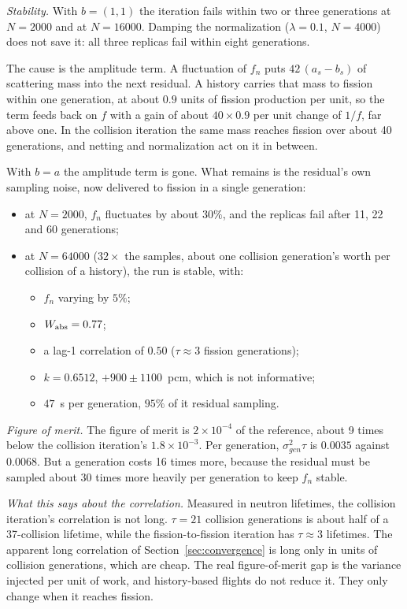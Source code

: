 \emph{Stability.} With $b=(1,1)$ the iteration fails within two or three generations at $N=2000$ and
at $N=16000$. Damping the normalization ($\lambda=0.1$, $N=4000$) does not save it: all three
replicas fail within eight generations.

The cause is the amplitude term. A fluctuation of $f_n$ puts $42\,(a_s-b_s)$ of scattering mass into
the next residual. A history carries that mass to fission within one generation, at about $0.9$
units of fission production per unit, so the term feeds back on $f$ with a gain of about $40\times0.9$
per unit change of $1/f$, far above one. In the collision iteration the same mass reaches fission over
about 40 generations, and netting and normalization act on it in between.

With $b=a$ the amplitude term is gone. What remains is the residual's own sampling noise, now
delivered to fission in a single generation:
\begin{itemize}
\item at $N=2000$, $f_n$ fluctuates by about $30\%$, and the replicas fail after 11, 22 and 60
  generations;
\item at $N=64000$ ($32\times$ the samples, about one collision generation's worth per collision of a
  history), the run is stable, with:
  \begin{itemize}
  \item $f_n$ varying by $5\%$;
  \item $W_{\mathrm{abs}}=0.77$;
  \item a lag-1 correlation of $0.50$ ($\tau\approx3$ fission generations);
  \item $k=0.6512$, $+900\pm1100$~pcm, which is not informative;
  \item $47$~s per generation, $95\%$ of it residual sampling.
  \end{itemize}
\end{itemize}

\emph{Figure of merit.} The figure of merit is $2\times10^{-4}$ of the reference, about 9 times
below the collision iteration's $1.8\times10^{-3}$. Per generation, $\sigma_{gen}^2\tau$ is $0.0035$
against $0.0068$. But a generation costs 16 times more, because the residual must be sampled about 30
times more heavily per generation to keep $f_n$ stable.

\emph{What this says about the correlation.} Measured in neutron lifetimes, the collision iteration's
correlation is not long. $\tau=21$ collision generations is about half of a 37-collision lifetime,
while the fission-to-fission iteration has $\tau\approx3$ lifetimes. The apparent long correlation of
Section~\ref{sec:convergence} is long only in units of collision generations, which are cheap. The
real figure-of-merit gap is the variance injected per unit of work, and history-based flights do not
reduce it. They only change when it reaches fission.

